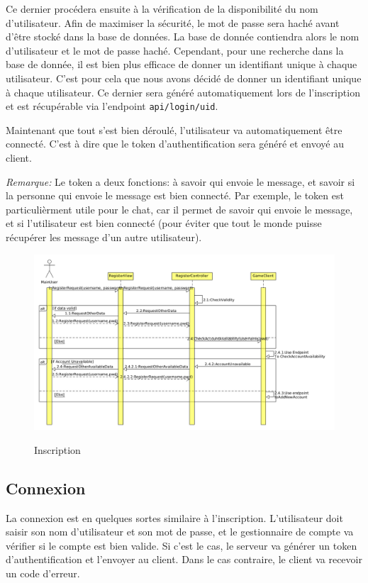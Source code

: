 \documentclass[../design_fonctionnement_sys.tex]{subfiles}
\begin{document}
Ce dernier procédera ensuite à la vérification de la disponibilité du nom d'utilisateur. Afin de maximiser la sécurité, le mot de passe sera haché avant d'être stocké dans la base de données.
La base de donnée contiendra alors le nom d'utilisateur et le mot de passe haché. Cependant, pour une recherche dans la base de donnée, 
il est  bien plus efficace de donner un identifiant unique à chaque utilisateur. C'est pour cela que nous avons décidé de donner un identifiant unique à chaque utilisateur.
Ce dernier sera généré automatiquement lors de l'inscription et est récupérable via l'endpoint \texttt{api/login/uid}.

Maintenant que tout s'est bien déroulé, l'utilisateur va automatiquement être connecté. C'est à dire que le token d'authentification sera généré et envoyé au client.

\textit{Remarque:} Le token a deux fonctions: à savoir qui envoie le message, et savoir si la personne qui envoie le message est bien connecté.
Par exemple, le token est particulièrment utile pour le chat, car il permet de savoir qui envoie le message, et si l'utilisateur est bien connecté (pour éviter que tout le monde puisse récupérer les message d'un autre utilisateur).

\begin{figure}[H]
    \centering
    \includegraphics[scale=0.4]{img_design/inscription_fonctionnement.png}
    \label{fig:seq_match_client}
    \caption{Inscription}
\end{figure}
\newpage

\subsection{Connexion}
La connexion est en quelques sortes similaire à l'inscription. L'utilisateur doit saisir son nom d'utilisateur et son mot de passe, et le gestionnaire de compte va vérifier
si le compte est bien valide. Si c'est le cas, le serveur va générer un token d'authentification et l'envoyer au client. Dans le cas contraire,
le client va recevoir un code d'erreur.
\end{document}

